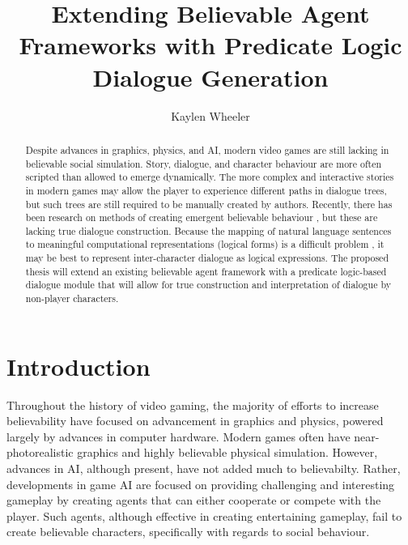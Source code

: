 \documentclass{article}
\begin{document}
\title{Extending Believable Agent Frameworks with Predicate
  Logic Dialogue Generation}
\author{Kaylen Wheeler}

\maketitle

\begin{abstract}

Despite advances in graphics, physics, and AI, modern video games are
still lacking in believable social simulation.  Story, dialogue, and
character behaviour are more often scripted than allowed to emerge
dynamically.  The more complex and interactive stories in modern games
may allow the player to experience different paths in dialogue trees,
but such trees are still required to be manually created by authors.
Recently, there has been research on methods of creating emergent
believable behaviour \cite{Acton2009,Mascarenhas,Mateasc}, but these are
lacking true dialogue construction.  Because the mapping of natural
language sentences to meaningful computational representations
(logical forms) is a difficult problem \cite{Zettlemoyer2004}, it
may be best to represent inter-character dialogue as logical expressions.
The proposed thesis will extend an existing believable agent
framework with a predicate logic-based dialogue module that will
allow for true construction and interpretation of dialogue by
non-player characters.

\end{abstract}

\section{Introduction}

Throughout the history of video gaming, the majority of efforts to
increase believability have focused on advancement in graphics and
physics, powered largely by advances in computer hardware.  Modern
games often have near-photorealistic graphics and highly believable
physical simulation.  However, advances in AI, although present, have
not added much to believabilty.  Rather, developments in game AI are
focused on providing challenging and interesting gameplay by creating
agents that can either cooperate or compete with the player.  Such
agents, although effective in creating entertaining gameplay, fail to
create believable characters, specifically with regards to social
behaviour.
\end{document}
